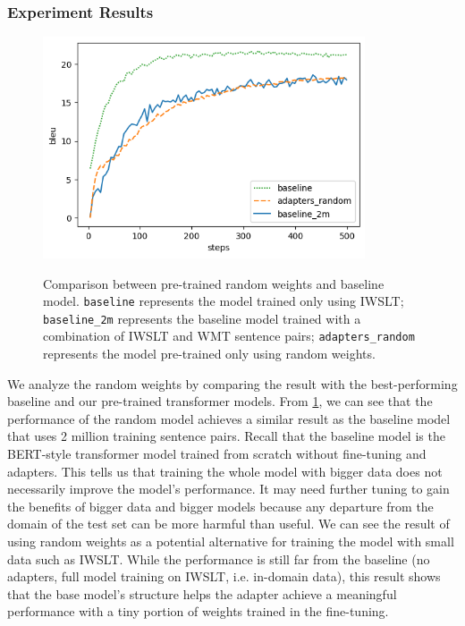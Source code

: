 \subsubsection{Experiment Results}

\begin{figure}[h]
    {\includegraphics[width=0.85\textwidth]{img/random.png}}
    \centering
    \caption[Comparison between pre-trained random weights and baseline model.]{Comparison between pre-trained random weights and baseline model. \texttt{baseline} represents the model trained only using IWSLT; \texttt{baseline\_2m} represents the baseline model trained with a combination of IWSLT and WMT sentence pairs; \texttt{adapters\_random} represents the model pre-trained only using random weights.}
    \label{img:rndbslcmp}
\end{figure}

We analyze the random weights by comparing the result with the best-performing baseline and our pre-trained transformer models. From \cref{img:rndbslcmp}, we can see that the performance of the random model achieves a similar result as the baseline model that uses 2 million training sentence pairs. Recall that the baseline model is the BERT-style transformer model trained from scratch without fine-tuning and adapters. This tells us that training the whole model with bigger data does not necessarily improve the model's performance. It may need further tuning to gain the benefits of bigger data and bigger models because any departure from the domain of the test set can be more harmful than useful. We can see the result of using random weights as a potential alternative for training the model with small data such as IWSLT. While the performance is still far from the baseline (no adapters, full model training on IWSLT, i.e. in-domain data), this result shows that the base model's structure helps the adapter achieve a meaningful performance with a tiny portion of weights trained in the fine-tuning.


